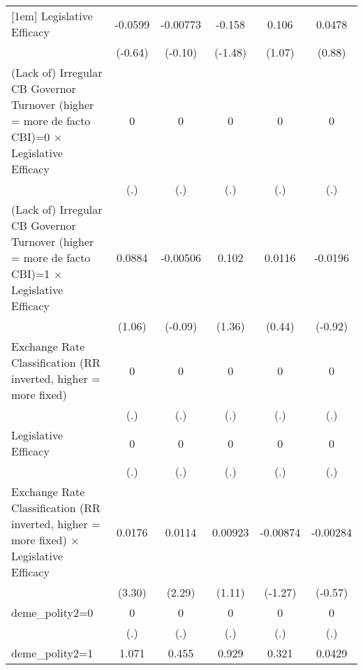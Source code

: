 {\begin{tabular}{l*{5}{c}}
[1em]
Legislative Efficacy&  -0.0599         & -0.00773         &   -0.158         &    0.106         &   0.0478         \\
                &  (-0.64)         &  (-0.10)         &  (-1.48)         &   (1.07)         &   (0.88)         \\
[1em]
(Lack of) Irregular CB Governor Turnover (higher = more de facto CBI)=0 $\times$ Legislative Efficacy&        0         &        0         &        0         &        0         &        0         \\
                &      (.)         &      (.)         &      (.)         &      (.)         &      (.)         \\
[1em]
(Lack of) Irregular CB Governor Turnover (higher = more de facto CBI)=1 $\times$ Legislative Efficacy&   0.0884         & -0.00506         &    0.102         &   0.0116         &  -0.0196         \\
                &   (1.06)         &  (-0.09)         &   (1.36)         &   (0.44)         &  (-0.92)         \\
[1em]
Exchange Rate Classification (RR inverted, higher = more fixed)&        0         &        0         &        0         &        0         &        0         \\
                &      (.)         &      (.)         &      (.)         &      (.)         &      (.)         \\
[1em]
Legislative Efficacy&        0         &        0         &        0         &        0         &        0         \\
                &      (.)         &      (.)         &      (.)         &      (.)         &      (.)         \\
[1em]
Exchange Rate Classification (RR inverted, higher = more fixed) $\times$ Legislative Efficacy&   0.0176\sym{**} &   0.0114\sym{*}  &  0.00923         & -0.00874         & -0.00284         \\
                &   (3.30)         &   (2.29)         &   (1.11)         &  (-1.27)         &  (-0.57)         \\
[1em]
deme\_polity2=0  &        0         &        0         &        0         &        0         &        0         \\
                &      (.)         &      (.)         &      (.)         &      (.)         &      (.)         \\
[1em]
deme\_polity2=1  &    1.071\sym{***}&    0.455\sym{**} &    0.929\sym{***}&    0.321         &   0.0429         \\

\end{tabular}}
